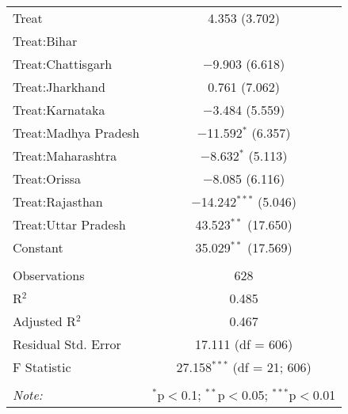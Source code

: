 
\begin{table}[!htbp] \centering 
  \caption{} 
  \label{} 
\begin{tabular}{@{\extracolsep{5pt}}lc} 
\\[-1.8ex]\hline 
 Treat & 4.353 (3.702) \\ 
  Treat:Bihar &  \\ 
  Treat:Chattisgarh & $-$9.903 (6.618) \\ 
  Treat:Jharkhand & 0.761 (7.062) \\ 
  Treat:Karnataka & $-$3.484 (5.559) \\ 
  Treat:Madhya Pradesh & $-$11.592$^{*}$ (6.357) \\ 
  Treat:Maharashtra & $-$8.632$^{*}$ (5.113) \\ 
  Treat:Orissa & $-$8.085 (6.116) \\ 
  Treat:Rajasthan & $-$14.242$^{***}$ (5.046) \\ 
  Treat:Uttar Pradesh & 43.523$^{**}$ (17.650) \\ 
  Constant & 35.029$^{**}$ (17.569) \\ 
 \hline \\[-1.8ex] 
Observations & 628 \\ 
R$^{2}$ & 0.485 \\ 
Adjusted R$^{2}$ & 0.467 \\ 
Residual Std. Error & 17.111 (df = 606) \\ 
F Statistic & 27.158$^{***}$ (df = 21; 606) \\ 
\hline 
\hline \\[-1.8ex] 
\textit{Note:}  & \multicolumn{1}{r}{$^{*}$p$<$0.1; $^{**}$p$<$0.05; $^{***}$p$<$0.01} \\ 
\end{tabular} 
\end{table} 
